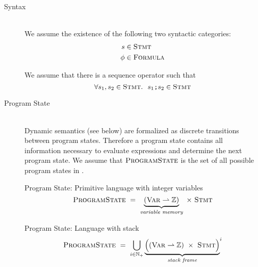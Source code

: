 \begin{description}
\item[Syntax]~\\
    We assume the existence of the following two syntactic categories:
    \begin{align*}
    	s    & \in \textup{\textsc{Stmt}}    \\
    	\phi & \in \textup{\textsc{Formula}}
    \end{align*}
    
    We assume that there is a sequence operator \ttt{;} such that $$\forall s_1, s_2 \in \textup{\textsc{Stmt}}.~~ s_1\textup{\texttt{;}}s_2 \in \textup{\textsc{Stmt}}$$
    
    \begin{comment}
    Let $\setStmt_s$ be the set of all statements having $s$ as prefix.
    \end{comment}
    
    
    
\item[Program State]~\\
    Dynamic semantics (see below) are formalized as discrete transitions between program states.
    Therefore a program state contains all information necessary to evaluate expressions and determine the next program state.
    We assume that $\textup{\textsc{ProgramState}}$ is the set of all possible program states in \svl.
    
    \begin{example}{Program State: Primitive language with integer variables}
        \label{ex:ps-primitive}
        \begin{displaymath}
        \textup{\textsc{ProgramState}} ~=~ \underbrace{(\textup{\textsc{Var}} \rightharpoonup \mathbb{Z})}_{\textit{variable memory}} ~\times~ \textup{\textsc{Stmt}} 
        \end{displaymath}
    \end{example}
    \begin{example}{Program State: Language with stack}
        \label{ex:ps-stacked}
        \begin{displaymath}
        \textup{\textsc{ProgramState}} ~=~ \bigcup_{i \in \mathbb{N}_+}{\underbrace{\Big((\textup{\textsc{Var}} \rightharpoonup \mathbb{Z}) ~\times~ \textup{\textsc{Stmt}} \Big)}_{\textit{stack frame}}}^i                                                      
        \end{displaymath}
    \end{example}
    

\end{description}
